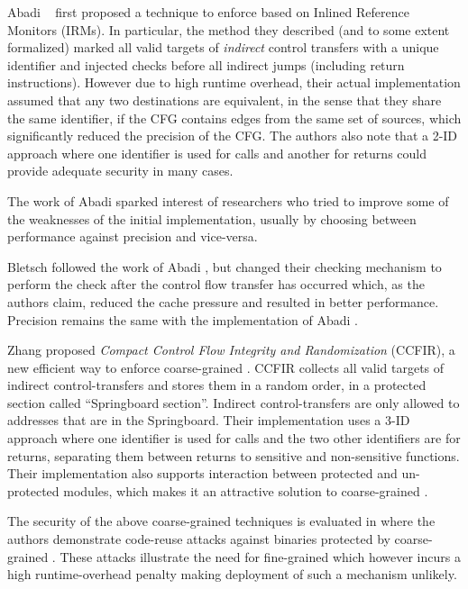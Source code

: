 Abadi \ETAL~\cite{abadi2005} first proposed a technique to enforce
\CFI based on Inlined Reference Monitors (IRMs). In particular, the
method they described (and to some extent formalized) marked all valid
targets of \emph{indirect} control transfers with a unique identifier
and injected checks before all indirect jumps (including return
instructions). However due to high runtime overhead, their actual
implementation assumed that any two destinations are equivalent, in
the sense that they share the same identifier, if the CFG contains
edges from the same set of sources, which significantly reduced the
precision of the CFG. The authors also note that a 2-ID approach where
one identifier is used for calls and another for returns could provide
adequate security in many cases.

The work of Abadi \ETAL sparked interest of researchers who tried to improve
some of the weaknesses of the initial implementation, usually by choosing
between performance against precision and vice-versa.

Bletsch \ETAL \cite{Bletsch:2011:MCA:2076732.2076783} followed the work
of Abadi \ETAL, but changed their checking mechanism to perform the check
after the control flow transfer has occurred which, as the authors claim,
reduced the cache pressure and resulted in better performance. Precision remains
the same with the implementation of Abadi \ETAL.

Zhang \ETAL \cite{Zhang2013} proposed \emph{Compact Control Flow Integrity
and Randomization} (CCFIR), a new efficient way to enforce coarse-grained \CFI.
CCFIR collects all valid targets of indirect control-transfers and stores them
in a random order, in a protected section called ``Springboard section''.
Indirect control-transfers are only allowed to addresses that are in the
Springboard. Their implementation uses a 3-ID approach where one identifier is
used for calls and the two other identifiers are for returns, separating them
between returns to sensitive and non-sensitive functions. Their implementation
also supports interaction between protected and un-protected modules, which
makes it an attractive solution to coarse-grained \CFI.

The security of the above coarse-grained techniques is evaluated in
\cite{outofcontrol_ieeesp2014} where the authors demonstrate
code-reuse attacks against binaries protected by coarse-grained
\CFI. These attacks illustrate the need for fine-grained \CFI which
however incurs a high runtime-overhead penalty making deployment of
such a mechanism unlikely.

